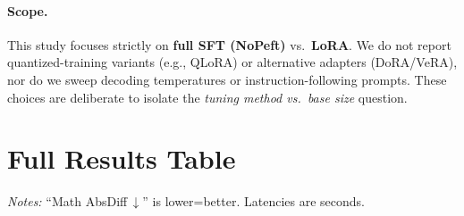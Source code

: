 \documentclass[11pt,a4paper]{article}
\begin{document}
\paragraph{Scope.}
This study focuses strictly on \textbf{full SFT (NoPeft)} vs.\ \textbf{LoRA}. We do not report quantized-training variants (e.g., QLoRA) or alternative adapters (DoRA/VeRA), nor do we sweep decoding temperatures or instruction-following prompts. These choices are deliberate to isolate the \emph{tuning method vs.\ base size} question.

\vspace{370pt}
\section{Full Results Table}
\label{sec:fulltable}

\noindent\textit{Notes:} ``Math AbsDiff\,$\downarrow$'' is lower=better. Latencies are seconds.
\end{document}
